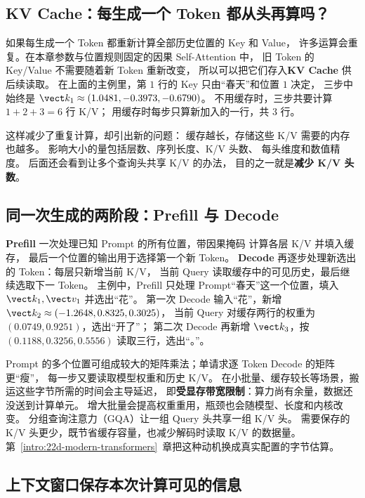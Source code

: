 \subsection{KV Cache：每生成一个 Token 都从头再算吗？}
\label{concept:kv-cache}

如果每生成一个 Token 都重新计算全部历史位置的 Key 和 Value，
许多运算会重复。在本章参数与位置规则固定的因果 Self-Attention 中，
旧 Token 的 Key/Value 不需要随着新 Token 重新改变，
所以可以把它们存入\textbf{KV Cache} 供后续读取。
在上面的主例里，第 $1$ 行的 Key 只由“春天”和位置 $1$ 决定，
三步中始终是 $\vect k_1\approx(1.0481,-0.3973,-0.6790)$。
不用缓存时，三步共要计算 $1+2+3=6$ 行 K/V；
用缓存时每步只算新加入的一行，共 $3$ 行。

这样减少了重复计算，却引出新的问题：
缓存越长，存储这些 K/V 需要的内存也越多。
影响大小的量包括层数、序列长度、K/V 头数、
每头维度和数值精度。
后面还会看到让多个查询头共享 K/V 的办法，
目的之一就是\textbf{减少 K/V 头数}。

\subsection{同一次生成的两阶段：Prefill 与 Decode}
\label{concept:prefill-decode}
\textbf{Prefill} 一次处理已知 Prompt 的所有位置，带因果掩码 计算各层 K/V 并填入缓存，
最后一个位置的输出用于选择第一个新 Token。
\textbf{Decode} 再逐步处理新选出的 Token：每层只新增当前 K/V，
当前 Query 读取缓存中的可见历史，最后继续选取下一 Token。
主例中，Prefill 只处理 Prompt“春天”这一个位置，填入 $\vect k_1,\vect v_1$ 并选出“花”。
第一次 Decode 输入“花”，新增 $\vect k_2\approx(-1.2648,0.8325,0.3025)$，
当前 Query 对缓存两行的权重为 $(0.0749,0.9251)$，选出“开了”；
第二次 Decode 再新增 $\vect k_3$，按 $(0.1188,0.3256,0.5556)$ 读取三行，选出“。”。

Prompt 的多个位置可组成较大的矩阵乘法；单请求逐 Token Decode 的矩阵更“瘦”，
每一步又要读取模型权重和历史 K/V。
在小批量、缓存较长等场景，搬运这些字节所需的时间会主导延迟，
即\textbf{受显存带宽限制}：算力尚有余量，数据还没送到计算单元。
增大批量会提高权重重用，瓶颈也会随模型、长度和内核改变。
\label{concept:gqa}
分组查询注意力（GQA）让一组 Query 头共享一组 K/V 头。
需要保存的 K/V 头更少，既节省缓存容量，也减少解码时读取 K/V 的数据量。
第~\ref*{intro:22d-modern-transformers}~章把这种动机换成真实配置的字节估算。

\subsection{上下文窗口保存本次计算可见的信息}

